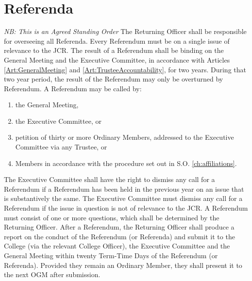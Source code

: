 \chapter{Referenda} \label{ch:referenda}
\textit{NB: This is an Agreed Standing Order}
\npara The Returning Officer shall be responsible for overseeing all Referenda.
\npara Every Referendum must be on a single issue of relevance to the JCR.  The result of a Referendum shall be binding on the General Meeting and the Executive Committee, in accordance with Articles \ref{Art:GeneralMeeting} and \ref{Art:TrusteeAccountability}, for two years.  During that two year period, the result of the Referendum may only be overturned by Referendum.
\npara \label{SO:ReferendumCall} A Referendum may be called by:
\begin{enumerate}
\item the General Meeting,
\item the Executive Committee, or
\item petition of thirty or more Ordinary Members, addressed to the Executive Committee via any Trustee, or
\item Members in accordance with the procedure set out in S.O. \ref{ch:affiliations}.
\end{enumerate}
\npara The Executive Committee shall have the right to dismiss any call for a Referendum if a Referendum has been held in the previous year on an issue that is substantively the same.  The Executive Committee must dismiss any call for a Referendum if the issue in question is not of relevance to the JCR.
\npara A Referendum must consist of one or more questions, which shall be determined by the Returning Officer.  After a Referendum, the Returning Officer shall produce a report on the conduct of the Referendum (or Referenda) and submit it to the College (via the relevant College Officer), the Executive Committee and the General Meeting within twenty Term-Time Days of the Referendum (or Referenda).  Provided they remain an Ordinary Member, they shall present it to the next OGM after submission.
